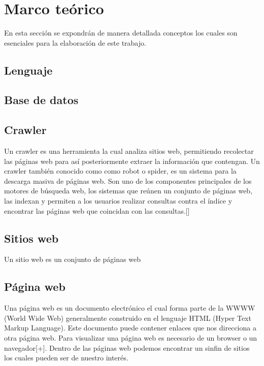 \chapter{Marco teórico}

En esta sección se expondrán de manera detallada conceptos los cuales son esenciales para la elaboración de este trabajo.


\section{Lenguaje}


\section{Base de datos}

\section{Crawler}

Un crawler es una herramienta la cual analiza sitios web, permitiendo recolectar las páginas web para así posteriormente extraer la información que contengan. Un crawler también conocido como como robot o spider, es un sistema para la descarga masiva de páginas web. Son uno de los componentes principales de los motores de búsqueda web, los sistemas que reúnen un conjunto de páginas web, las indexan y permiten a los usuarios realizar consultas contra el índice y encontrar las páginas web que coincidan con las consultas.[\*]


\section{Sitios web}

Un sitio web es un conjunto de páginas web

\section{Página web}

Una página web es un documento electrónico el cual forma parte de la WWWW (World Wide Web) generalmente construido en el lenguaje HTML (Hyper Text Markup Language). Este documento puede contener enlaces que nos direcciona a otra página web. Para visualizar una página web es necesario de un browser o un navegador[+]. Dentro de las páginas web podemos encontrar un sinfin de sitios los cuales pueden ser de nuestro interés.

